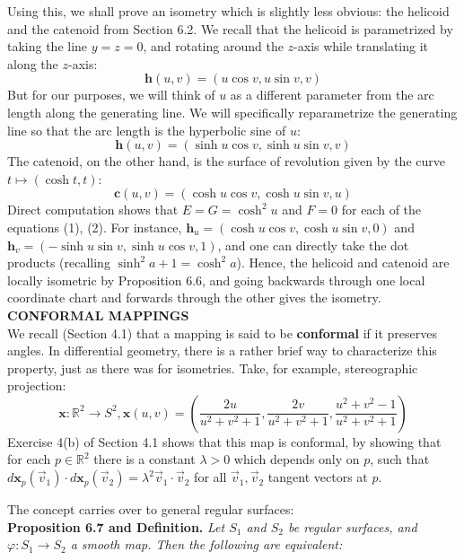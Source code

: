 \documentclass[leqno]{book}
\begin{document}
\noindent Using this, we shall prove an isometry which is slightly less obvious: the helicoid and the catenoid from Section 6.2.  We recall that the helicoid is parametrized by taking the line $y=z=0$, and rotating around the $z$-axis while translating it along the $z$-axis:
$$\mathbf h(u,v)=(u\cos v,u\sin v,v)$$
But for our purposes, we will think of $u$ as a different parameter from the arc length along the generating line.  We will specifically reparametrize the generating line so that the arc length is the hyperbolic sine of $u$:
\begin{equation}\tag{1}\mathbf h(u,v)=(\sinh u\cos v,\sinh u\sin v,v)\end{equation}
The catenoid, on the other hand, is the surface of revolution given by the curve $t\mapsto(\cosh t,t)$:
\begin{equation}\tag{2}\mathbf c(u,v)=(\cosh u\cos v,\cosh u\sin v,u)\end{equation}
Direct computation shows that $E=G=\cosh^2u$ and $F=0$ for each of the equations (1), (2).  For instance, $\mathbf h_u=(\cosh u\cos v,\cosh u\sin v,0)$ and $\mathbf h_v=(-\sinh u\sin v,\sinh u\cos v,1)$, and one can directly take the dot products (recalling $\sinh^2a+1=\cosh^2a$).  Hence, the helicoid and catenoid are locally isometric by Proposition 6.6, and going backwards through one local coordinate chart and forwards through the other gives the isometry.\\

\noindent\textbf{CONFORMAL MAPPINGS}\\

\noindent We recall (Section 4.1) that a mapping is said to be \textbf{conformal} if it preserves angles.  In differential geometry, there is a rather brief way to characterize this property, just as there was for isometries.  Take, for example, stereographic projection:
$$\mathbf x:\mathbb R^2\to S^2,\mathbf x(u,v)=\left(\frac{2u}{u^2+v^2+1},\frac{2v}{u^2+v^2+1},\frac{u^2+v^2-1}{u^2+v^2+1}\right)$$
Exercise 4(b) of Section 4.1 shows that this map is conformal, by showing that for each $p\in\mathbb R^2$ there is a constant $\lambda>0$ which depends only on $p$, such that $d\mathbf x_p(\vec v_1)\cdot d\mathbf x_p(\vec v_2)=\lambda^2\vec v_1\cdot\vec v_2$ for all $\vec v_1,\vec v_2$ tangent vectors at $p$.

The concept carries over to general regular surfaces:\\

\noindent\textbf{Proposition 6.7 and Definition.} \emph{Let $S_1$ and $S_2$ be regular surfaces, and $\varphi:S_1\to S_2$ a smooth map.  Then the following are equivalent:}
\end{document}
